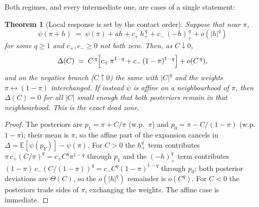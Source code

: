 \documentclass[11pt]{article}
\newtheorem{theorem}{Theorem}
\newcommand{\E}{\mathbb{E}}
\begin{document}
Both regimes, and every intermediate one, are cases of a single
statement:

\begin{theorem}[Local response is set by the contact order]\label{thm:contact}
Suppose that near $\pi$,
\[
\psi(\pi+h)\;=\;\psi(\pi)+ah+c_+\,h_+^{\,q}+c_-\,(-h)_+^{\,q}+o(|h|^q)
\]
for some $q\ge1$ and $c_+,c_-\ge0$ not both zero. Then, as $C\downarrow0$,
\[
\Delta(C)\;=\;C^{\,q}\Bigl[c_+\,\pi^{1-q}+c_-\,(1-\pi)^{1-q}\Bigr]+o(C^{\,q}),
\]
and on the negative branch ($C\uparrow0$) the same with $|C|^q$ and the
weights $\pi\leftrightarrow(1-\pi)$ interchanged. If instead $\psi$ is
affine on a neighbourhood of $\pi$, then $\Delta(C)=0$ for all $|C|$ small
enough that both posteriors remain in that neighbourhood. This is the exact dead
zone.
\end{theorem}

\begin{proof}
The posteriors are $p_1=\pi+C/\pi$ (w.p.\ $\pi$) and $p_0=\pi-C/(1-\pi)$
(w.p.\ $1-\pi$); their mean is $\pi$, so the affine part of the expansion
cancels in $\Delta=\E[\psi(p_Y)]-\psi(\pi)$. For $C>0$ the $h_+^q$ term
contributes $\pi\,c_+(C/\pi)^q=c_+C^q\pi^{1-q}$ through $p_1$ and the
$(-h)_+^q$ term contributes $(1-\pi)\,c_-(C/(1-\pi))^q=c_-C^q(1-\pi)^{1-q}$
through $p_0$; both posterior deviations are $\Theta(C)$, so the $o(|h|^q)$
remainder is $o(C^q)$. For $C<0$ the posteriors trade sides of $\pi$,
exchanging the weights. The affine case is immediate.
\end{proof}
\end{document}
